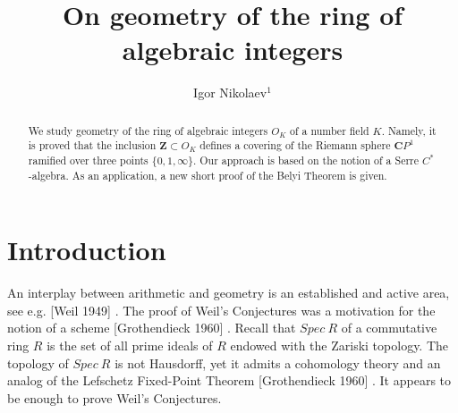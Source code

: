 \documentclass[10pt, reqno]{amsart}
\theoremstyle{definition}
\theoremstyle{remark}
\numberwithin{equation}{section}
\begin{document}
\setcounter{page}{1}

\title[On geometry of the ring of algebraic integers]{On geometry of the ring of algebraic integers}

\author[I.Nikolaev]
{Igor Nikolaev$^1$}

\address{$^{1}$ Department of Mathematics and Computer Science, St.~John's University, 8000 Utopia Parkway,  
New York,  NY 11439, United States.}
\email{\textcolor[rgb]{0.00,0.00,0.84}{igor.v.nikolaev@gmail.com}}







\begin{abstract}
We study  geometry of  the ring of algebraic integers $O_K$ of a number field $K$. 
Namely, it is proved that the inclusion $\mathbf{Z}\subset O_K$ defines a covering 
of the Riemann sphere $\mathbf{C}P^1$ ramified over three points $\{0,1,\infty\}$.  
 Our approach is based on the notion of a Serre $C^*$-algebra.   
 As an application, a new short  proof of the Belyi Theorem
 is given. 
 \end{abstract} 


\maketitle








\section{Introduction}
An interplay  between arithmetic and geometry is an established and active  area,
see e.g.  [Weil 1949] \cite{Wei1}.  
The proof of  Weil's Conjectures was a  motivation  for the notion  of a scheme
[Grothendieck 1960]  \cite{Gro1}.  Recall that $Spec~R$  
of  a commutative ring $R$ is  the set of all prime ideals of $R$ endowed 
with the Zariski topology.   The topology of  $Spec~R$ is not  Hausdorff, yet it  admits a 
cohomology theory and an analog of the Lefschetz Fixed-Point Theorem  [Grothendieck 1960]  \cite{Gro1}.
It appears to be enough to prove Weil's Conjectures. 
\end{document}
